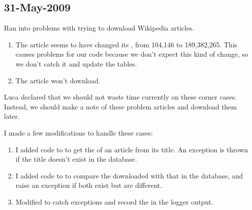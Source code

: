 \subsection{31-May-2009}

Ran into problems with trying to download Wikipedia articles.
\begin{enumerate}
\item The article  seems to have changed
	its , from 104,146 to 189,382,265.
	This causes problems for our code because we don't expect
	this kind of change, so we don't catch it and update the tables.
\item The article  won't download.
\end{enumerate}

Luca declared that we should not waste time currently on these corner cases.
Instead, we should make a note of these problem articles
and download them later.

I made a few modifications to handle these cases:
\begin{enumerate}
\item I added code to  to get the 
	of an article from its title.  An exception is thrown if the
	title doesn't exist in the database.
\item I added code to  to compare the
	 downloaded with that in the database,
	and raise an exception if both exist but are different.
\item Modified  to catch exceptions and record
	the  in the logger output.
\end{enumerate}

